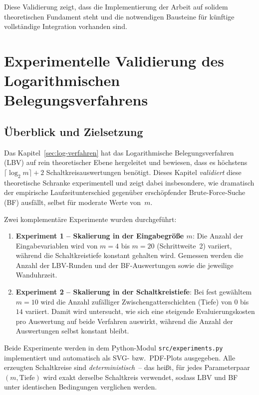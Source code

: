 ﻿\documentclass[a4paper,12pt]{article}
\theoremstyle{definition}
\begin{document}
Diese Validierung zeigt, dass die Implementierung der Arbeit auf solidem theoretischen Fundament steht und die notwendigen Bausteine für künftige vollständige Integration vorhanden sind.

\section{Experimentelle Validierung des Logarithmischen Belegungsverfahrens}
\label{sec:experimente}

\subsection{Überblick und Zielsetzung}

Das Kapitel~\ref{sec:log-verfahren} hat das Logarithmische Belegungsverfahren (LBV) auf
rein theoretischer Ebene hergeleitet und bewiesen, dass es höchstens
$\lceil \log_2 m \rceil + 2$ Schaltkreisauswertungen benötigt.  Dieses Kapitel
\emph{validiert} diese theoretische Schranke experimentell und zeigt dabei
insbesondere, wie dramatisch der empirische Laufzeitunterschied gegenüber
erschöpfender Brute-Force-Suche (BF) ausfällt, selbst für moderate Werte von~$m$.

Zwei komplementäre Experimente wurden durchgeführt:

\begin{enumerate}
  \item \textbf{Experiment 1 -- Skalierung in der Eingabegröße $m$}:  Die Anzahl der
    Eingabevariablen wird von $m = 4$ bis $m = 20$ (Schrittweite~2) variiert, während
    die Schaltkreistiefe konstant gehalten wird.  Gemessen werden die Anzahl der LBV-Runden
    und der BF-Auswertungen sowie die jeweilige Wanduhrzeit.

  \item \textbf{Experiment 2 -- Skalierung in der Schaltkreistiefe}:  Bei fest gewähltem
    $m = 10$ wird die Anzahl zufälliger Zwischengatterschichten (Tiefe) von $0$ bis $14$
    variiert.  Damit wird untersucht, wie sich eine steigende Evaluierungskosten pro
    Auswertung auf beide Verfahren auswirkt, während die Anzahl der Auswertungen selbst
    konstant bleibt.
\end{enumerate}

Beide Experimente werden in dem Python-Modul \texttt{src/experiments.py} implementiert
und automatisch als SVG- bzw.\ PDF-Plots ausgegeben.  Alle erzeugten Schaltkreise
sind \emph{deterministisch}~-- das heißt, für jedes Parameterpaar $(m, \mathrm{Tiefe})$
wird exakt derselbe Schaltkreis verwendet, sodass LBV und BF unter identischen
Bedingungen verglichen werden.
\end{document}
